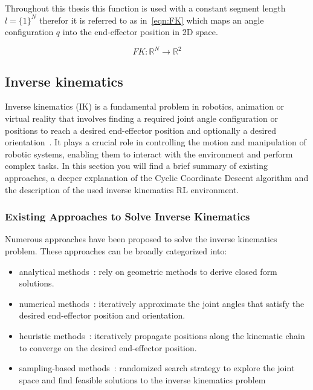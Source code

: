 Throughout this thesis this function is used with a constant segment length $l = \{1\}^N$ therefor it is referred to as in~\eqref{eqn:FK} which maps an angle configuration $q$ into the end-effector position in 2D space.

\begin{equation}\label{eqn:FK}
	FK: \mathbb{R}^N \to \mathbb{R}^2
\end{equation}

\subsection{Inverse kinematics}

Inverse kinematics (IK) is a fundamental problem in robotics, animation or virtual reality that involves finding a required joint angle configuration or positions to reach a desired end-effector position and optionally a desired orientation~\cite{InverseKinemaitcs}. It plays a crucial role in controlling the motion and manipulation of robotic systems, enabling them to interact with the environment and perform complex tasks. 
In this section you will find a brief summary of existing approaches, a deeper explanation of the Cyclic Coordinate Descent algorithm and the description of the used inverse kinematics RL environment.

\subsubsection{Existing Approaches to Solve Inverse Kinematics}

Numerous approaches have been proposed to solve the inverse kinematics problem. These approaches can be broadly categorized into: 
\begin{itemize}
	\item analytical methods~\cite{IK_ClosedForm}: rely on geometric methods to derive closed form solutions.
	\item numerical methods~\cite{NumericalMethods}: iteratively approximate the joint angles that satisfy the desired end-effector position and orientation.
	\item heuristic methods~\cite{NumericalMethods}: iteratively propagate positions along the kinematic chain to converge on the desired end-effector position.
	\item sampling-based methods~\cite{NumericalMethods}: randomized search strategy to explore the joint space and find feasible solutions to the inverse kinematics problem
\end{itemize}

